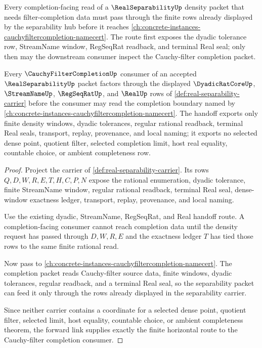 Every completion-facing read of a $\RealSeparabilityUp$ density packet that needs filter-completion data must pass through the finite rows already displayed by the separability hub before it reaches \autoref{ch:concrete-instances-cauchyfiltercompletion-namecert}. The route first exposes the dyadic tolerance row, StreamName window, RegSeqRat readback, and terminal Real seal; only then may the downstream consumer inspect the Cauchy-filter completion packet.

\begin{theorem}
\label{thm:real-separability-cauchy-filter-completion-forward-link}
Every $\CauchyFilterCompletionUp$ consumer of an accepted $\RealSeparabilityUp$ packet factors through the displayed $\DyadicRatCoreUp$, $\StreamNameUp$, $\RegSeqRatUp$, and $\RealUp$ rows of \autoref{def:real-separability-carrier} before the consumer may read the completion boundary named by \autoref{ch:concrete-instances-cauchyfiltercompletion-namecert}. The handoff exports only finite density windows, dyadic tolerances, regular rational readback, terminal Real seals, transport, replay, provenance, and local naming; it exports no selected dense point, quotient filter, selected completion limit, host real equality, countable choice, or ambient completeness row.
\end{theorem}
\begin{proof}
Project the carrier of \autoref{def:real-separability-carrier}. Its rows $Q,D,W,R,E,T,H,C,P,N$ expose the rational enumeration, dyadic tolerance, finite StreamName window, regular rational readback, terminal Real seal, dense-window exactness ledger, transport, replay, provenance, and local naming.

Use the existing dyadic, StreamName, RegSeqRat, and Real handoff route. A completion-facing consumer cannot reach completion data until the density request has passed through $D,W,R,E$ and the exactness ledger $T$ has tied those rows to the same finite rational read.

Now pass to \autoref{ch:concrete-instances-cauchyfiltercompletion-namecert}. The completion packet reads Cauchy-filter source data, finite windows, dyadic tolerances, regular readback, and a terminal Real seal, so the separability packet can feed it only through the rows already displayed in the separability carrier.

Since neither carrier contains a coordinate for a selected dense point, quotient filter, selected limit, host equality, countable choice, or ambient completeness theorem, the forward link supplies exactly the finite horizontal route to the Cauchy-filter completion consumer.
\end{proof}

